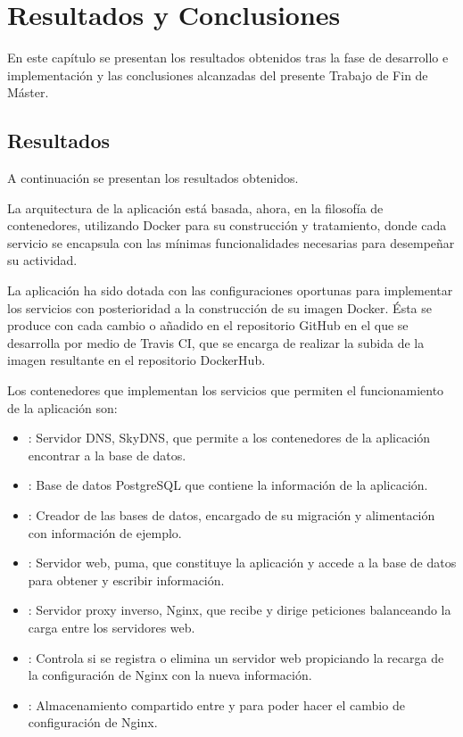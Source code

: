 \chapter{Resultados y Conclusiones}
\label{cha:results}

En este capítulo se presentan los resultados obtenidos tras la fase de desarrollo e implementación y las conclusiones alcanzadas del presente Trabajo de Fin de Máster.

\section{Resultados}

A continuación se presentan los resultados obtenidos.

La arquitectura de la aplicación está basada, ahora, en la filosofía de contenedores, utilizando Docker para su construcción y tratamiento, donde cada servicio se encapsula con las mínimas funcionalidades necesarias para desempeñar su actividad.

La aplicación ha sido dotada con las configuraciones oportunas para implementar los servicios con posterioridad a la construcción de su imagen Docker. Ésta se produce con cada cambio o añadido en el repositorio GitHub en el que se desarrolla por medio de Travis CI, que se encarga de realizar la subida de la imagen resultante en el repositorio DockerHub.

Los contenedores que implementan los servicios que permiten el funcionamiento de la aplicación son:
\begin{itemize}
\item {}: Servidor DNS, SkyDNS, que permite a los contenedores de la aplicación encontrar a la base de datos.
\item {}: Base de datos PostgreSQL que contiene la información de la aplicación.
\item {}: Creador de las bases de datos, encargado de su migración y alimentación con información de ejemplo.
\item {}: Servidor web, puma, que constituye la aplicación y accede a la base de datos para obtener y escribir información.
\item {}: Servidor proxy inverso, Nginx, que recibe y dirige peticiones balanceando la carga entre los servidores web.
\item {}: Controla si se registra o elimina un servidor web propiciando la recarga de la configuración de Nginx con la nueva información.
\item {}: Almacenamiento compartido entre  y  para poder hacer el cambio de configuración de Nginx.
\end{itemize}

